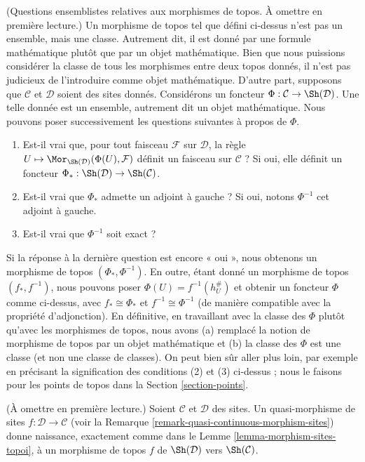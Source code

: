 \begin{remark}
\label{remark-morphism-topoi-big}
(Questions ensemblistes relatives aux morphismes de topos. À omettre
en première lecture.)
Un morphisme de topos tel que défini ci-dessus n’est pas un ensemble, mais une classe.
Autrement dit, il est donné par une formule mathématique plutôt que par un
objet mathématique. Bien que nous puissions considérer
la classe de tous les morphismes entre deux topos donnés,
il n’est pas judicieux de l’introduire comme objet mathématique.
D’autre part, supposons que $\mathcal{C}$ et $\mathcal{D}$ soient
des sites donnés. Considérons un foncteur
$\Phi : \mathcal{C} \to \Sh(\mathcal{D})$.
Une telle donnée est un ensemble, autrement dit un objet mathématique.
Nous pouvons poser successivement les questions suivantes à propos de $\Phi$.
\begin{enumerate}
\item Est-il vrai que, pour tout faisceau $\mathcal{F}$ sur $\mathcal{D}$,
la règle
$U \mapsto \Mor_{\Sh(\mathcal{D})}(\Phi(U), \mathcal{F})$
définit un faisceau sur $\mathcal{C}$ ? Si oui, elle définit un foncteur
$\Phi_* : \Sh(\mathcal{D}) \to \Sh(\mathcal{C})$.
\item Est-il vrai que $\Phi_*$ admette un adjoint à gauche ? Si oui,
notons $\Phi^{-1}$ cet adjoint à gauche.
\item Est-il vrai que $\Phi^{-1}$ soit exact ?
\end{enumerate}
Si la réponse à la dernière question est encore « oui », nous obtenons
un morphisme de topos $(\Phi_*, \Phi^{-1})$. En outre, étant donné un
morphisme de topos $(f_*, f^{-1})$, nous pouvons poser
$\Phi(U) = f^{-1}(h_U^\#)$ et obtenir un foncteur $\Phi$ comme ci-dessus,
avec $f_* \cong \Phi_*$ et $f^{-1} \cong \Phi^{-1}$ (de manière compatible
avec la propriété d’adjonction).
En définitive, en travaillant avec la classe des $\Phi$
plutôt qu’avec les morphismes de topos, nous avons (a) remplacé la notion de
morphisme de topos par un objet mathématique et (b)
la classe des $\Phi$ est une classe (et non une classe
de classes). On peut bien sûr aller plus loin, par exemple en précisant
la signification des conditions (2) et (3) ci-dessus ;
nous le faisons pour les points de topos dans la Section \ref{section-points}.
\end{remark}

\begin{remark}
\label{remark-quasi-continuous-morphism-topoi}
(À omettre en première lecture.)
Soient $\mathcal{C}$ et $\mathcal{D}$ des sites.
Un quasi-morphisme de sites $f : \mathcal{D} \to \mathcal{C}$
(voir la Remarque \ref{remark-quasi-continuous-morphism-sites})
donne naissance, exactement comme dans le
Lemme \ref{lemma-morphism-sites-topoi}, à un morphisme de topos $f$ de
$\Sh(\mathcal{D})$ vers $\Sh(\mathcal{C})$.
\end{remark}










